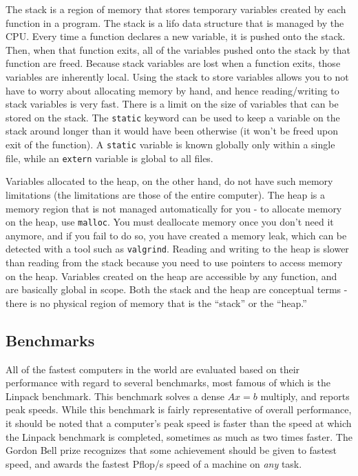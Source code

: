 \documentclass[10pt]{article}
\begin{document}
\begin{flushleft}
The stack is a region of memory that stores temporary variables created by each function in a program. The stack is a \gls{lifo} data structure that is managed by the CPU. Every time a function declares a new variable, it is pushed onto the stack. Then, when that function exits, all of the variables pushed onto the stack by that function are freed. Because stack variables are lost when a function exits, those variables are inherently local. Using the stack to store variables allows you to not have to worry about allocating memory by hand, and hence reading/writing to stack variables is very fast. There is a limit on the size of variables that can be stored on the stack. The {\tt static} keyword can be used to keep a variable on the stack around longer than it would have been otherwise (it won't be freed upon exit of the function). A {\tt static} variable is known globally only within a single file, while an {\tt extern} variable is global to all files.

Variables allocated to the heap, on the other hand, do not have such memory limitations (the limitations are those of the entire computer). The heap is a memory region that is not managed automatically for you - to allocate memory on the heap, use {\tt malloc}. You must deallocate memory once you don't need it anymore, and if you fail to do so, you have created a memory leak, which can be detected with a tool such as {\tt valgrind}. Reading and writing to the heap is slower than reading from the stack because you need to use pointers to access memory on the heap. Variables created on the heap are accessible by any function, and are basically global in scope. Both the stack and the heap are conceptual terms - there is no physical region of memory that is the ``stack'' or the ``heap.''

\subsection{Benchmarks}

All of the fastest computers in the world are evaluated based on their performance with regard to several benchmarks, most famous of which is the Linpack benchmark. This benchmark solves a dense \(Ax=b\) multiply, and reports peak speeds. While this benchmark is fairly representative of overall performance, it should be noted that a computer's peak speed is faster than the speed at which the Linpack benchmark is completed, sometimes as much as two times faster. The Gordon Bell prize recognizes that some achievement should be given to fastest speed, and awards the fastest Pflop/s speed of a machine on \textit{any} task.


\end{flushleft}
\end{document}
